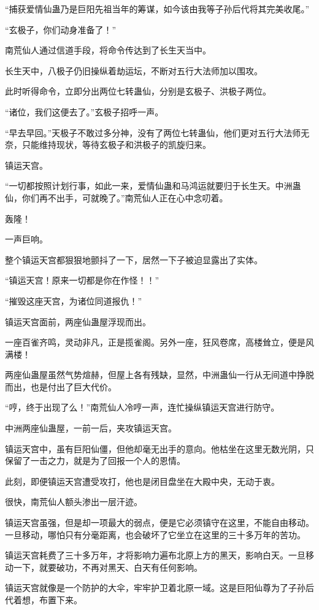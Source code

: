 \begin{this_body}
“捕获爱情仙蛊乃是巨阳先祖当年的筹谋，如今该由我等子孙后代将其完美收尾。”

“玄极子，你们动身准备了！”

南荒仙人通过信道手段，将命令传达到了长生天当中。

长生天中，八极子仍旧操纵着劫运坛，不断对五行大法师加以围攻。

此时听得命令，立即分出两位七转蛊仙，分别是玄极子、洪极子两位。

“诸位，我们这便去了。”玄极子招呼一声。

“早去早回。”天极子不敢过多分神，没有了两位七转蛊仙，他们更对五行大法师无奈，只能维持现状，等待玄极子和洪极子的凯旋归来。

镇运天宫。

“一切都按照计划行事，如此一来，爱情仙蛊和马鸿运就要归于长生天。中洲蛊仙，你们再不出手，可就晚了。”南荒仙人正在心中念叨着。

轰隆！

一声巨响。

整个镇运天宫都狠狠地颤抖了一下，居然一下子被迫显露出了实体。

“镇运天宫！原来一切都是你在作怪！！”

“摧毁这座天宫，为诸位同道报仇！”

镇运天宫面前，两座仙蛊屋浮现而出。

一座百雀齐鸣，灵动非凡，正是揽雀阁。另外一座，狂风卷席，高楼耸立，便是风满楼！

两座仙蛊屋虽然气势煊赫，但屋上各有残缺，显然，中洲蛊仙一行从无间道中挣脱而出，也是付出了巨大代价。

“哼，终于出现了么！”南荒仙人冷哼一声，连忙操纵镇运天宫进行防守。

中洲两座仙蛊屋，一前一后，夹攻镇运天宫。

镇运天宫中，虽有巨阳仙僵，但他却毫无出手的意向。他枯坐在这里无数光阴，只保留了一击之力，就是为了回报一个人的恩情。

此刻，即便镇运天宫遭受攻打，他也是闭目盘坐在大殿中央，无动于衷。

很快，南荒仙人额头渗出一层汗迹。

镇运天宫虽强，但是却一项最大的弱点，便是它必须镇守在这里，不能自由移动。一旦移动，哪怕只有分毫距离，也会破坏了它坐立在这里的三十多万年的苦功。

镇运天宫耗费了三十多万年，才将影响力遍布北原上方的黑天，影响白天。一旦移动一下，就要破功，不再对黑天、白天有任何影响。

镇运天宫就像是一个防护的大伞，牢牢护卫着北原一域。这是巨阳仙尊为了子孙后代着想，布置下来。


\end{this_body}
